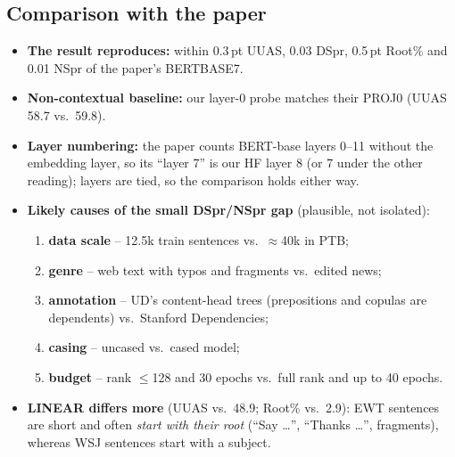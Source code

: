 \documentclass[11pt,a4paper]{article}
\newcommand{\pt}{\,pt}
\begin{document}
\subsection{Comparison with the paper}\label{sec:paper}
\begin{table}[h]\centering\footnotesize
\caption{Our numbers vs.\ \citet{hewitt} Table~1 (PTB WSJ test, BERT-base \emph{cased}, Stanford Dependencies).}
\label{tab:paper}\end{table}
\begin{itemize}
\item \textbf{The result reproduces:} within 0.3\pt{} UUAS, 0.03 DSpr, 0.5\pt{} Root\% and 0.01 NSpr of the paper's BERTBASE7.
\item \textbf{Non-contextual baseline:} our layer-0 probe matches their PROJ0 (UUAS 58.7 vs.\ 59.8).
\item \textbf{Layer numbering:} the paper counts BERT-base layers 0--11 without the embedding layer, so its ``layer 7'' is our HF
layer 8 (or 7 under the other reading); layers \TiedLayers{} are tied, so the comparison holds either way.
\item \textbf{Likely causes of the small DSpr/NSpr gap} (plausible, not isolated):
\begin{enumerate}
\item \textbf{data scale} -- 12.5k train sentences vs.\ $\approx$40k in PTB;
\item \textbf{genre} -- web text with typos and fragments vs.\ edited news;
\item \textbf{annotation} -- UD's content-head trees (prepositions and copulas are dependents) vs.\ Stanford Dependencies;
\item \textbf{casing} -- uncased vs.\ cased model;
\item \textbf{budget} -- rank $\le$128 and 30 epochs vs.\ full rank and up to 40 epochs.
\end{enumerate}
\item \textbf{LINEAR differs more} (UUAS \LinUUAS{} vs.\ 48.9; Root\% \LinRoot{} vs.\ 2.9): EWT sentences are short and often
\emph{start with their root} (``Say \ldots'', ``Thanks \ldots'', fragments), whereas WSJ sentences start with a subject.
\end{itemize}
\end{document}
